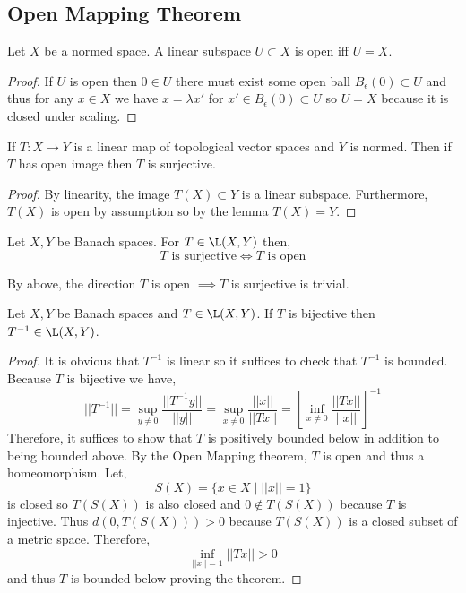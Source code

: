 \documentclass[12pt]{article}
\begin{document}
\subsection{Open Mapping Theorem}

\begin{lemma}
Let $X$ be a normed space. A linear subspace $U \subset X$ is open iff $U = X$.
\end{lemma}

\begin{proof}
If $U$ is open then $0 \in U$ there must exist some open ball $B_\epsilon(0) \subset U$ and thus for any $x \in X$ we have $x = \lambda x'$ for $x' \in B_\epsilon(0) \subset U$ so $U = X$ because it is closed under scaling.
\end{proof}

\begin{cor}
If $T : X \to Y$ is a linear map of topological vector spaces and $Y$ is normed. Then if $T$ has open image then $T$ is surjective.
\end{cor}

\begin{proof}
By linearity, the image $T(X) \subset Y$ is a linear subspace. Furthermore, $T(X)$ is open by assumption so by the lemma $T(X) = Y$.
\end{proof}

\begin{thm}
Let $X, Y$ be Banach spaces. For $T \in \L(X, Y)$ then,
\[ T \text{ is surjective} \iff T \text{ is open} \]
\end{thm}

\begin{rmk}
By above, the direction $T$ is open $\implies T$ is surjective is trivial.
\end{rmk}

\begin{thm}
Let $X, Y$ be Banach spaces and $T \in \L(X, Y)$. If $T$ is bijective then $T^{-1} \in \L(X, Y)$.
\end{thm}

\begin{proof}
It is obvious that $T^{-1}$ is linear so it suffices to check that $T^{-1}$ is bounded. Because $T$ is bijective we have,
\[ || T^{-1} || = \sup_{y \neq 0} \frac{|| T^{-1} y ||}{|| y ||} = \sup_{x \neq 0} \frac{|| x ||}{|| T x ||} = \left[ \inf_{x \neq 0} \frac{|| Tx ||}{|| x ||} \right]^{-1} \]
Therefore, it suffices to show that $T$ is positively bounded below in addition to being bounded above. By the Open Mapping theorem, $T$ is open and thus a homeomorphism. Let,
\[ S(X) = \{ x \in X \mid || x || = 1 \} \]
is closed so $T(S(X))$ is also closed and $0 \notin T(S(X))$ because $T$ is injective. Thus $d(0, T(S(X))) > 0$ because $T(S(X))$ is a closed subset of a metric space.
Therefore, 
\[ \inf_{||x|| = 1} || T x || > 0 \] 
and thus $T$ is bounded below proving the theorem.
\end{proof}
\end{document}
